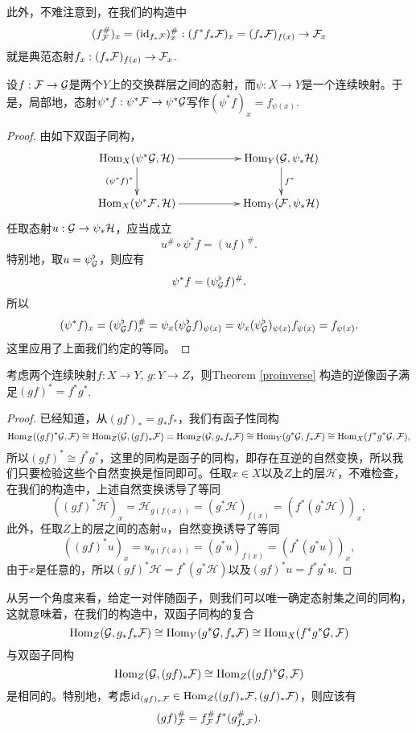 此外，不难注意到，在我们的构造中
\[
	(f_{\mathcal{F}}^\#)_x=(\operatorname{id}_{f_*\mathcal{F}})^\#_x:(f^*f_*\mathcal{F})_x=(f_*\mathcal{F})_{f(x)}\to \mathcal{F}_x
\]
就是典范态射$f_x:(f_*\mathcal{F})_{f(x)}\to \mathcal{F}_x$.

\begin{pro}
设$f:\mathcal{F}\to\mathcal{G}$是两个$Y$上的交换群层之间的态射，而$\psi:X\to Y$是一个连续映射。于是，局部地，态射$\psi^*f:\psi^*\mathcal{F}\to \psi^*\mathcal{G}$写作$(\psi^* f)_x=f_{\psi(x)}$.
\end{pro}

\begin{proof}
由如下双函子同构，
\[
	\xymatrix{
		\Hom_X(\psi^*\calg,\mathcal{H})\ar[rr] \ar[d]_{(\psi^*f)^*}&&\Hom_Y(\calg,\psi_*\mathcal{H}) \ar[d]^{f^*}\\
		\Hom_X(\psi^*\calf,\mathcal{H})\ar[rr]&&\Hom_Y(\calf,\psi_*\mathcal{H})
	}
\]
任取态射$u:\mathcal{G}\to \psi_*\mathcal{H}$，应当成立
\[
	u^\#\circ \psi^* f=(uf)^\#.
\]
特别地，取$u=\psi_{\mathcal{G}}^\flat$，则应有
\[
	\psi^* f=(\psi_{\mathcal{G}}^\flat f)^\#.
\]
所以
\[
	(\psi^* f)_x=(\psi_{\mathcal{G}}^\flat f)^\#_x =\psi_x (\psi_{\mathcal{G}}^\flat f)_{\psi(x)}=\psi_x (\psi_{\mathcal{G}}^\flat)_{\psi(x)} f_{\psi(x)}=f_{\psi(x)}.
\]
这里应用了上面我们约定的等同。
\end{proof}

\begin{pro}[逆像函子的复合]
考虑两个连续映射$f:X\to Y$, $g:Y\to Z$，则Theorem \ref{proinverse} 构造的逆像函子满足$(gf)^*=f^*g^*$.
\end{pro}

\begin{proof}
已经知道，从$(gf)_*=g_*f_*$，我们有函子性同构
\[
	\operatorname{Hom}_Z((gf)^*\mathcal{G},\mathcal{F})\cong \operatorname{Hom}_Z(\mathcal{G},(gf)_*\mathcal{F})=\operatorname{Hom}_Z(\mathcal{G},g_*f_*\mathcal{F})\cong \operatorname{Hom}_Y(g^*\mathcal{G},f_*\mathcal{F})\cong \operatorname{Hom}_X(f^*g^*\mathcal{G},\mathcal{F}),
\]
所以$(gf)^*\cong f^*g^*$，这里的同构是函子的同构，即存在互逆的自然变换，所以我们只要检验这些个自然变换是恒同即可。任取$x\in X$以及$Z$上的层$\mathcal H$，不难检查，在我们的构造中，上述自然变换诱导了等同
\[
	((gf)^*\mathcal H)_x=\mathcal H_{g(f(x))}=(g^* \mathcal H)_{f(x)}=(f^*(g^*\mathcal H))_x,
\]
此外，任取$Z$上的层之间的态射$u$，自然变换诱导了等同
\[
	((gf)^* u)_x= u_{g(f(x))}=(g^* u)_{f(x)}=(f^*(g^* u))_x,
\]
由于$x$是任意的，所以$(gf)^*\mathcal H=f^*(g^*\mathcal H)$以及$(gf)^* u=f^*g^* u$.
\end{proof}

从另一个角度来看，给定一对伴随函子，则我们可以唯一确定态射集之间的同构，这就意味着，在我们的构造中，双函子同构的复合
\[
	\operatorname{Hom}_Z(\mathcal{G},g_*f_*\mathcal{F})\cong \operatorname{Hom}_Y(g^*\mathcal{G},f_*\mathcal{F})\cong \operatorname{Hom}_X(f^*g^*\mathcal{G},\mathcal{F})
\]
与双函子同构
\[
	\operatorname{Hom}_Z(\mathcal{G},(gf)_*\mathcal{F})\cong \operatorname{Hom}_Z((gf)^*\mathcal{G},\mathcal{F})
\]
是相同的。特别地，考虑$\operatorname{id}_{(gf)_*\mathcal{F}}\in \operatorname{Hom}_Z((gf)_*\mathcal{F},(gf)_*\mathcal{F})$，则应该有
\[
	(gf)^\#_{\mathcal{F}} = f_{\mathcal{F}}^\# f^*(g_{f_*\mathcal{F}}^\#).
\]


